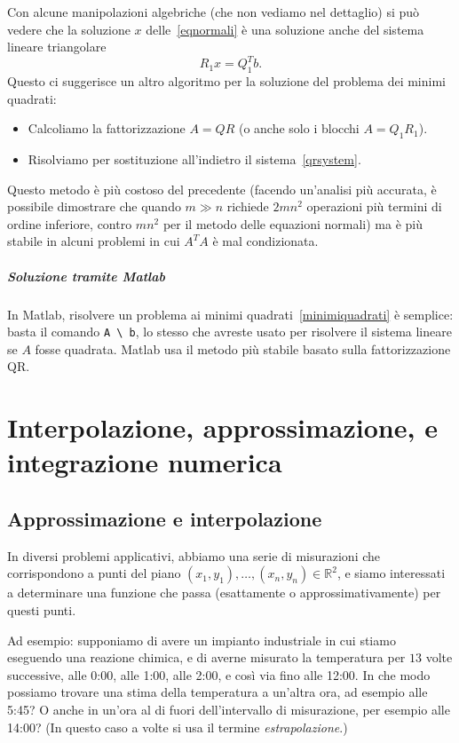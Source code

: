 \documentclass[a4paper]{report}
\theoremstyle{definiton}
\theoremstyle{remark}
\begin{document}
Con alcune manipolazioni algebriche (che non vediamo nel dettaglio) si può vedere che la soluzione $x$ delle~\eqref{eqnormali} è una soluzione anche del sistema lineare triangolare
\begin{equation} \label{qrsystem}
    R_1 x = Q_1^T b.    
\end{equation}
Questo ci suggerisce un altro algoritmo per la soluzione del problema dei minimi quadrati:
\begin{itemize}
    \item Calcoliamo la fattorizzazione $A=QR$ (o anche solo i blocchi $A = Q_1 R_1$).
    \item Risolviamo per sostituzione all'indietro il sistema~\eqref{qrsystem}.
\end{itemize}
Questo metodo è più costoso del precedente (facendo un'analisi più accurata, è possibile dimostrare che quando $m\gg n$ richiede $2mn^2$ operazioni più termini di ordine inferiore, contro $mn^2$ per il metodo delle equazioni normali) ma è più stabile in alcuni problemi in cui $A^TA$ è mal condizionata.

\paragraph{Soluzione tramite Matlab} In Matlab, risolvere un problema ai minimi quadrati~\eqref{minimiquadrati} è semplice: basta il comando \lstinline{A \ b}, lo stesso che avreste usato per risolvere il sistema lineare se $A$ fosse quadrata. Matlab usa il metodo più stabile basato sulla fattorizzazione QR.

\chapter{Interpolazione, approssimazione, e integrazione numerica}

\section{Approssimazione e interpolazione}

In diversi problemi applicativi, abbiamo una serie di misurazioni che corrispondono a punti del piano $(x_1, y_1), \dots, (x_n, y_n) \in \mathbb{R}^2$, e siamo interessati a determinare una funzione che passa (esattamente o approssimativamente) per questi punti.

Ad esempio: supponiamo di avere un impianto industriale in cui stiamo eseguendo una reazione chimica, e di averne misurato la temperatura per $13$ volte successive, alle 0:00, alle 1:00, alle 2:00, e così via fino alle 12:00. In che modo possiamo trovare una stima della temperatura a un'altra ora, ad esempio alle 5:45? O anche in un'ora al di fuori dell'intervallo di misurazione, per esempio alle 14:00? (In questo caso a volte si usa il termine \emph{estrapolazione}.)
\end{document}
